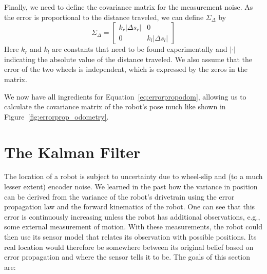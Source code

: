 Finally, we need to define the covariance matrix for the measurement noise. As the error is proportional to the distance traveled, we can define $ \Sigma_{\Delta}$ by
\begin{equation}
\Sigma_{\Delta}=\left[\begin{array}{cc}k_r|\Delta s_r| & 0\\0 & k_l|\Delta s_l|\end{array}\right]
\end{equation}
Here $ k_r$ and $ k_l$ are constants that need to be found experimentally and $ |\cdot |$ indicating the absolute value of the distance traveled. We also assume that the error of the two wheels is independent, which is expressed by the zeros in the matrix.

We now have all ingredients for Equation~\ref{eq:errorpropodom}, allowing us to calculate the covariance matrix of the robot's pose much like shown in Figure~\ref{fig:errorprop_odometry}.

\section{The Kalman Filter}
The location of a robot is subject to uncertainty due to wheel-slip and (to a much lesser extent) encoder noise. We learned in the past how the variance in position can be derived from the variance of the robot's drivetrain using the error propagation law and the forward kinematics of the robot. One can see that this error is continuously increasing unless the robot has additional observations, e.g., some external measurement of motion.
With these measurements, the robot could then use its sensor model that relates its observation with possible positions.
Its real location would therefore be somewhere between its original belief based on error propagation and where the sensor tells it to be.
The goals of this section are:

